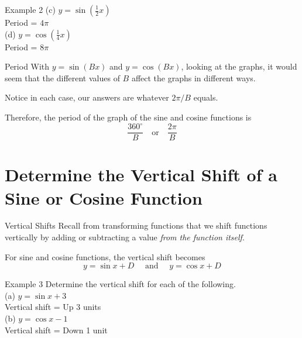 \documentclass[t,usenames,dvipsnames]{beamer}
\begin{document}
\begin{frame}{Example 2}
(c) \quad $y = \sin \left(\frac{1}{2} x\right)$ \newline\\  \pause
Period = $4\pi$    \vspace{12pt}  \newline\\ \pause
(d) \quad $y = \cos \left(\frac{1}{4} x\right)$ \newline\\  \pause
Period = $8\pi$
\end{frame}

\begin{frame}{Period}
With $y = \sin(Bx)$ and $y = \cos(Bx)$, looking at the graphs, it would seem that the different values of $B$ affect the graphs in different ways.    \newline\\  \pause 

Notice in each case, our answers are whatever $2\pi / B$ equals. \newline\\ \pause

Therefore, the period of the graph of the sine and cosine functions is
\[
\frac{360^\circ}{B} \quad \text{or} \quad \frac{2\pi}{B}
\]
\end{frame}


\section{Determine the Vertical Shift of a Sine or Cosine Function}

\begin{frame}{Vertical Shifts}
Recall from transforming functions that we shift functions vertically by adding or subtracting a value \emph{from the function itself}.   \newline\\ \pause

For sine and cosine functions, the vertical shift becomes
\[
y = \sin x + D  \quad   \text{ and }    \quad   y = \cos x + D
\]
\end{frame}

\begin{frame}{Example 3}
Determine the vertical shift for each of the following.  \newline\\
(a) \quad $y = \sin x + 3$  \newline\\ \pause
Vertical shift = Up 3 units \newline\\ \pause
(b) \quad $y = \cos x - 1$ \newline\\ \pause
Vertical shift = Down 1 unit
\end{frame}
\end{document}
